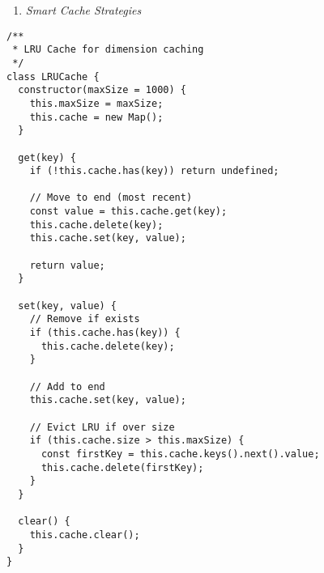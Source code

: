 \documentclass[11pt]{article}
\begin{document}
\begin{enumerate}
\item \emph{Smart Cache Strategies}
\end{enumerate}
\begin{verbatim}
/**
 * LRU Cache for dimension caching
 */
class LRUCache {
  constructor(maxSize = 1000) {
    this.maxSize = maxSize;
    this.cache = new Map();
  }
  
  get(key) {
    if (!this.cache.has(key)) return undefined;
    
    // Move to end (most recent)
    const value = this.cache.get(key);
    this.cache.delete(key);
    this.cache.set(key, value);
    
    return value;
  }
  
  set(key, value) {
    // Remove if exists
    if (this.cache.has(key)) {
      this.cache.delete(key);
    }
    
    // Add to end
    this.cache.set(key, value);
    
    // Evict LRU if over size
    if (this.cache.size > this.maxSize) {
      const firstKey = this.cache.keys().next().value;
      this.cache.delete(firstKey);
    }
  }
  
  clear() {
    this.cache.clear();
  }
}
\end{verbatim}
\end{document}
